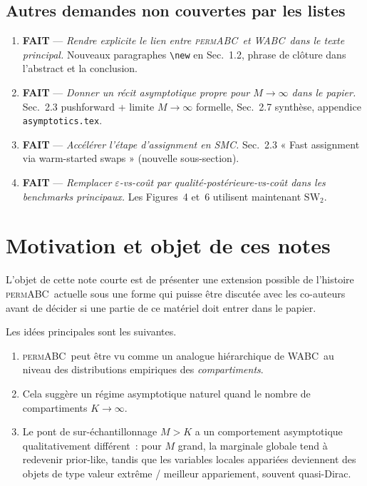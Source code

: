 \documentclass[11pt]{article}
\newcommand{\permABC}{\textsc{permABC}}
\newcommand{\WABC}{\textsc{WABC}}
\begin{document}
\subsection*{Autres demandes non couvertes par les listes}
\begin{enumerate}[leftmargin=*]
    \item \textcolor{green!55!black}{\textbf{FAIT}} --- \emph{Rendre explicite le lien entre
    \permABC\ et \WABC\ dans le texte principal.} Nouveaux paragraphes
    \texttt{\textbackslash new} en Sec.~1.2, phrase de clôture dans l'abstract et la conclusion.
    \item \textcolor{green!55!black}{\textbf{FAIT}} --- \emph{Donner un récit asymptotique propre
    pour $M\to\infty$ dans le papier.} Sec.~2.3 pushforward + limite $M\to\infty$ formelle,
    Sec.~2.7 synthèse, appendice \texttt{asymptotics.tex}.
    \item \textcolor{green!55!black}{\textbf{FAIT}} --- \emph{Accélérer l'étape d'assignment en
    SMC.} Sec.~2.3 « Fast assignment via warm-started swaps » (nouvelle sous-section).
    \item \textcolor{green!55!black}{\textbf{FAIT}} --- \emph{Remplacer $\varepsilon$-vs-coût par
    qualité-postérieure-vs-coût dans les benchmarks principaux.} Les Figures~4 et~6 utilisent
    maintenant $\mathrm{SW}_2$.
\end{enumerate}

\section{Motivation et objet de ces notes}

L'objet de cette note courte est de présenter une extension possible de l'histoire \permABC\
actuelle sous une forme qui puisse être discutée avec les co-auteurs avant de décider si une
partie de ce matériel doit entrer dans le papier.

Les idées principales sont les suivantes.
\begin{enumerate}[label=(\arabic*)]
    \item \permABC\ peut être vu comme un analogue hiérarchique de \WABC\ au niveau des
    distributions empiriques des \emph{compartiments}.
    \item Cela suggère un régime asymptotique naturel quand le nombre de compartiments
    $K \to \infty$.
    \item Le pont de sur-échantillonnage $M > K$ a un comportement asymptotique qualitativement
    différent~: pour $M$ grand, la marginale globale tend à redevenir prior-like, tandis que les
    variables locales appariées deviennent des objets de type valeur extrême / meilleur
    appariement, souvent quasi-Dirac.
\end{enumerate}
\end{document}
